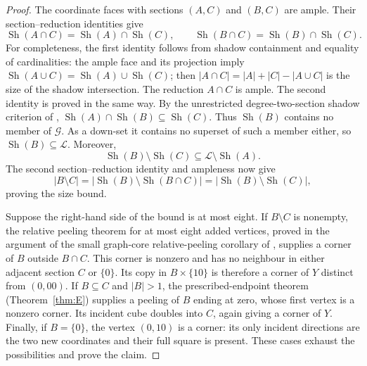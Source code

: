 \documentclass[11pt]{article}
\numberwithin{equation}{section}
\theoremstyle{definition}
\theoremstyle{remark}
\begin{document}
\begin{proof}
The coordinate faces with sections $(A,C)$ and $(B,C)$ are ample.
Their section--reduction identities give
\[
 \operatorname{Sh}(A\cap C)=\operatorname{Sh}(A)\cap\operatorname{Sh}(C),
 \qquad
 \operatorname{Sh}(B\cap C)=\operatorname{Sh}(B)\cap\operatorname{Sh}(C).
\]
For completeness, the first identity follows from shadow containment
and equality of cardinalities: the ample face and its projection imply
$\operatorname{Sh}(A\cup C)=\operatorname{Sh}(A)\cup\operatorname{Sh}(C)$;
then $|A\cap C|=|A|+|C|-|A\cup C|$ is the size of the shadow
intersection. The reduction $A\cap C$ is ample. The second identity
is proved in the same way.
By the unrestricted degree-two-section shadow criterion of
\cite{BousquetDampReader},
$\operatorname{Sh}(A)\cap\operatorname{Sh}(B)
 \subseteq\operatorname{Sh}(C)$.
Thus $\operatorname{Sh}(B)$ contains no member of $\mathcal G$.
As a down-set it contains no superset of such a member either, so
$\operatorname{Sh}(B)\subseteq\mathcal L$. Moreover,
\[
 \operatorname{Sh}(B)\setminus\operatorname{Sh}(C)
       \subseteq\mathcal L\setminus\operatorname{Sh}(A).
\]
The second section--reduction identity and ampleness now give
\[
 |B\setminus C|
 =|\operatorname{Sh}(B)\setminus\operatorname{Sh}(B\cap C)|
 =|\operatorname{Sh}(B)\setminus\operatorname{Sh}(C)|,
\]
proving the size bound.

Suppose the right-hand side of the bound is at most eight.
If $B\setminus C$ is nonempty, the relative peeling theorem for at
most eight added vertices, proved in the argument of
the small graph-core relative-peeling corollary of
\cite{BousquetDampReader}, supplies a corner
of $B$ outside $B\cap C$. This corner is nonzero and has no neighbour
in either adjacent section $C$ or $\{0\}$. Its copy in $B\times\{10\}$
is therefore a corner of $Y$ distinct from $(0,00)$.
If $B\subseteq C$ and $|B|>1$, the prescribed-endpoint theorem
(Theorem~\ref{thm:E}) supplies a peeling
of $B$ ending at zero, whose first vertex is a nonzero corner.
Its incident cube doubles into $C$, again giving a corner of $Y$.
Finally, if $B=\{0\}$, the vertex $(0,10)$ is a corner: its only
incident directions are the two new coordinates and their full square
is present. These cases exhaust the possibilities and prove the claim.
\end{proof}
\end{document}
